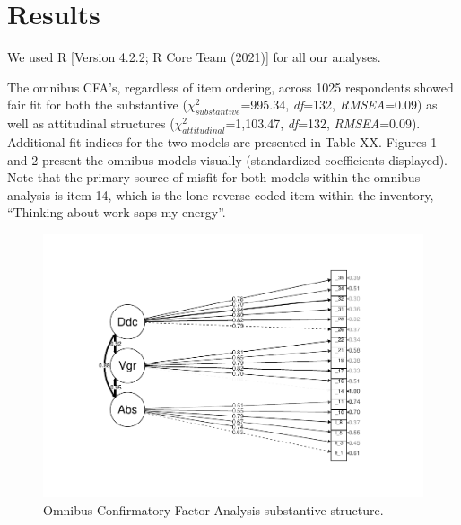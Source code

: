 \documentclass[
  man]{apa6}
\begin{document}
\hypertarget{results}{%
\section{Results}\label{results}}

We used R {[}Version 4.2.2; R Core Team (2021){]} for all our analyses.

The omnibus CFA's, regardless of item ordering, across 1025 respondents showed fair fit for both the substantive (\(\chi^2_{substantive}\)=995.34, \emph{df}=132, \emph{RMSEA}=0.09) as well as attitudinal structures (\(\chi^2_{attitudinal}\)=1,103.47, \emph{df}=132, \emph{RMSEA}=0.09). Additional fit indices for the two models are presented in Table XX. Figures 1 and 2 present the omnibus models visually (standardized coefficients displayed). Note that the primary source of misfit for both models within the omnibus analysis is item 14, which is the lone reverse-coded item within the inventory, ``Thinking about work saps my energy''.

\begin{figure}
\centering
\includegraphics{EngagementPaper_files/figure-latex/semplotsub-1.pdf}
\caption{\label{fig:semplotsub}Omnibus Confirmatory Factor Analysis substantive structure.}
\end{figure}
\end{document}
